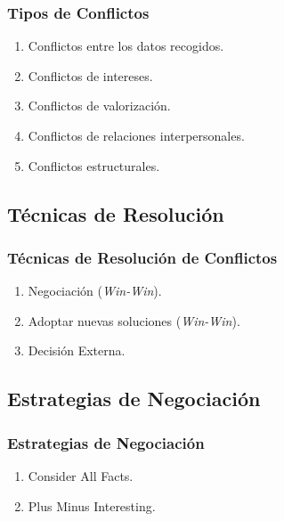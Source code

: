 \documentclass[a4paper,slidestop,xcolor=pst,dvips,blue]{beamer}
\begin{document}
\begin{frame}[c]
    \frametitle{Tipos de Conflictos}
    \begin{enumerate}
        \item Conflictos entre los datos recogidos.
        \item Conflictos de intereses.
        \item Conflictos de valorización.
        \item Conflictos de relaciones interpersonales.
        \item Conflictos estructurales.
    \end{enumerate}
\end{frame}

\subsection{Técnicas de Resolución}

\begin{frame}[c]
    \frametitle{Técnicas de Resolución de Conflictos}
    \begin{enumerate}
        \item Negociación (\emph{Win-Win}).
        \item Adoptar nuevas soluciones (\emph{Win-Win}).
        \item Decisión Externa.
    \end{enumerate}
\end{frame}

\subsection{Estrategias de Negociación}

\begin{frame}[c]
    \frametitle{Estrategias de Negociación}
    \begin{enumerate}
        \item Consider All Facts.
        \item Plus Minus Interesting.
    \end{enumerate}
\end{frame}
\end{document}
